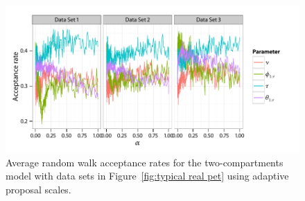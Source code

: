 \begin{figure}[t]
  \UseAltLinespread
  \includegraphics[width=\linewidth]{fig_src/Adaptive_Proposal}
  \caption[Acceptance rates of adaptive \protect\smc algorithms]
  {Average random walk acceptance rates for the two-compartments \pet model with data sets in Figure~\ref{fig:typical real pet} using adaptive proposal scales.}
  \label{fig:pet adaptive proposal}
\end{figure}
